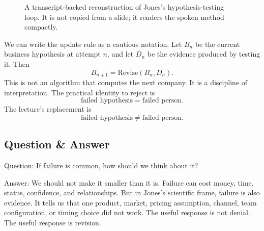 \begin{figure}
\centering
{}
\caption{A transcript-backed reconstruction of Jones's hypothesis-testing loop. It is not copied from a slide; it renders the spoken method compactly.}
\end{figure}

We can write the update rule as a cautious notation. Let \(B_n\) be the current business hypothesis at attempt \(n\), and let \(D_n\) be the evidence produced by testing it. Then
\begin{equation}
B_{n+1}=\mathrm{Revise}(B_n,D_n).
\end{equation}
This is not an algorithm that computes the next company. It is a discipline of interpretation. The practical identity to reject is
\begin{equation}
\text{failed hypothesis}=\text{failed person}.
\end{equation}
The lecture's replacement is
\begin{equation}
\text{failed hypothesis}\neq\text{failed person}.
\end{equation}

\subsection{Question \& Answer}

Question: If failure is common, how should we think about it?

Answer: We should not make it smaller than it is. Failure can cost money, time, status, confidence, and relationships. But in Jones's scientific frame, failure is also evidence. It tells us that one product, market, pricing assumption, channel, team configuration, or timing choice did not work. The useful response is not denial. The useful response is revision.

